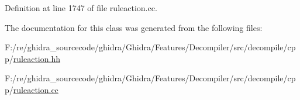 Definition at line 1747 of file ruleaction.\+cc.



The documentation for this class was generated from the following files\+:\begin{DoxyCompactItemize}
\item 
F\+:/re/ghidra\+\_\+sourcecode/ghidra/\+Ghidra/\+Features/\+Decompiler/src/decompile/cpp/\mbox{\hyperlink{ruleaction_8hh}{ruleaction.\+hh}}\item 
F\+:/re/ghidra\+\_\+sourcecode/ghidra/\+Ghidra/\+Features/\+Decompiler/src/decompile/cpp/\mbox{\hyperlink{ruleaction_8cc}{ruleaction.\+cc}}\end{DoxyCompactItemize}
